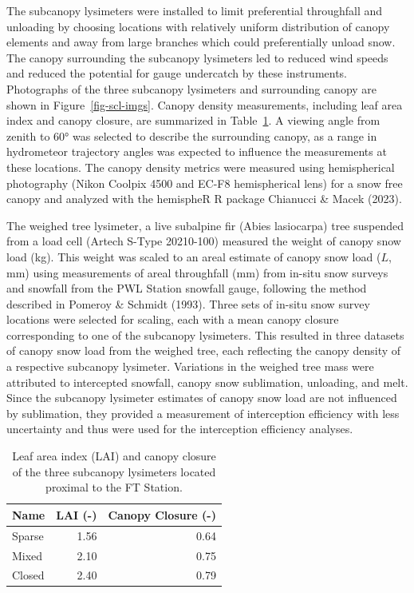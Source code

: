 \documentclass[
  letterpaper,
]{tex/uofsthesis-cs}
\begin{document}
The subcanopy lysimeters were installed to limit preferential
throughfall and unloading by choosing locations with relatively uniform
distribution of canopy elements and away from large branches which could
preferentially unload snow. The canopy surrounding the subcanopy
lysimeters led to reduced wind speeds and reduced the potential for
gauge undercatch by these instruments. Photographs of the three
subcanopy lysimeters and surrounding canopy are shown in
Figure~\ref{fig-scl-imgs}. Canopy density measurements, including leaf
area index and canopy closure, are summarized in
Table~\ref{tbl-scl-lai-cc}. A viewing angle from zenith to 60° was
selected to describe the surrounding canopy, as a range in hydrometeor
trajectory angles was expected to influence the measurements at these
locations. The canopy density metrics were measured using hemispherical
photography (Nikon Coolpix 4500 and EC-F8 hemispherical lens) for a snow
free canopy and analyzed with the hemispheR R package Chianucci \& Macek
(2023).

The weighed tree lysimeter, a live subalpine fir (Abies lasiocarpa) tree
suspended from a load cell (Artech S-Type 20210-100) measured the weight
of canopy snow load (kg). This weight was scaled to an areal estimate of
canopy snow load (\(L\), mm) using measurements of areal throughfall
(mm) from in-situ snow surveys and snowfall from the PWL Station
snowfall gauge, following the method described in Pomeroy \& Schmidt
(1993). Three sets of in-situ snow survey locations were selected for
scaling, each with a mean canopy closure corresponding to one of the
subcanopy lysimeters. This resulted in three datasets of canopy snow
load from the weighed tree, each reflecting the canopy density of a
respective subcanopy lysimeter. Variations in the weighed tree mass were
attributed to intercepted snowfall, canopy snow sublimation, unloading,
and melt. Since the subcanopy lysimeter estimates of canopy snow load
are not influenced by sublimation, they provided a measurement of
interception efficiency with less uncertainty and thus were used for the
interception efficiency analyses.

\begin{longtable}[]{@{}lrr@{}}

\caption{\label{tbl-scl-lai-cc}Leaf area index (LAI) and canopy closure
of the three subcanopy lysimeters located proximal to the FT Station.}

\tabularnewline

\toprule\noalign{}
Name & LAI (-) & Canopy Closure (-) \\
\midrule\noalign{}
\endhead
\bottomrule\noalign{}
\endlastfoot
Sparse & 1.56 & 0.64 \\
Mixed & 2.10 & 0.75 \\
Closed & 2.40 & 0.79 \\

\end{longtable}
\end{document}
